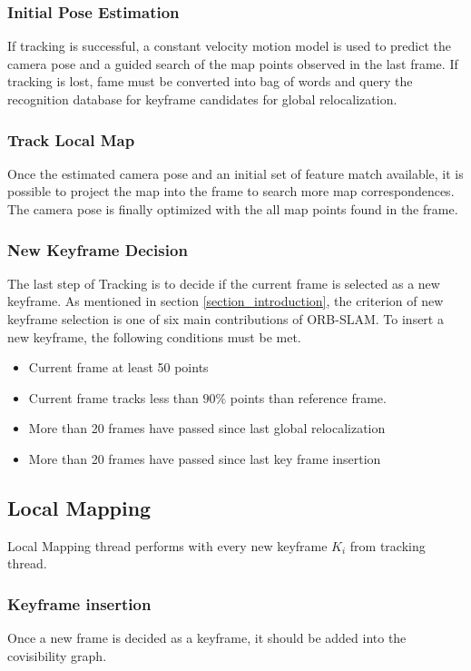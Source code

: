 \documentclass[letterpaper, 10 pt, conference]{ieeeconf}  %
\begin{document}
\subsubsection{Initial Pose Estimation}
If tracking is successful, a constant velocity motion model is used to predict the camera pose and a guided search of the map points observed in the last frame. If tracking is lost, fame must be converted into bag of words and query the recognition database for keyframe candidates for global relocalization.

\subsubsection{Track Local Map}
Once the estimated camera pose and an initial set of feature match available, it is possible to project the map into the frame to search more map correspondences. The camera pose is finally optimized with the all map points found in the frame.

\subsubsection{New Keyframe Decision}
The last step of Tracking is to decide if the current frame is selected as a new keyframe. As mentioned in section \ref{section_introduction}, the criterion of new keyframe selection is one of six main contributions of ORB-SLAM. To insert a new keyframe, the following conditions must be met.
\begin{itemize}
\item Current frame at least 50 points
\item Current frame tracks less than $90\%$ points than reference frame.
\item More than 20 frames have passed since last global relocalization
\item More than 20 frames have passed since last key frame insertion
\end{itemize}


\subsection{Local Mapping}
Local Mapping thread performs with every new keyframe $K_i$ from tracking thread.

\subsubsection{Keyframe insertion}
Once a new frame is decided as a keyframe, it should be added into the covisibility graph. 
\end{document}
